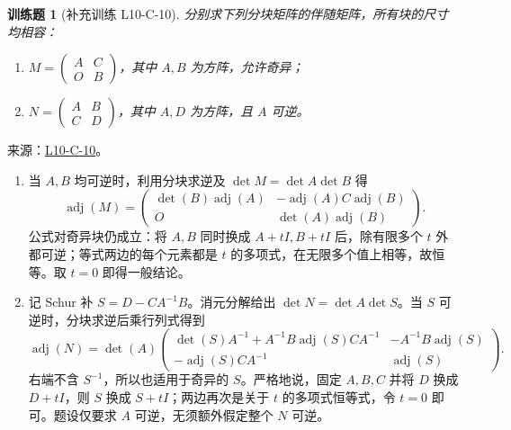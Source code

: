 \documentclass[12pt,fontset=fandol]{ctexart}
\newtheorem{exercise}{训练题}[section]
\begin{document}
\begin{exercise}[补充训练 L10-C-10]\label{prob:L10-C-10}
分别求下列分块矩阵的伴随矩阵，所有块的尺寸均相容：
\begin{enumerate}
\item $M=\begin{pmatrix}A&C\\O&B\end{pmatrix}$，其中 $A,B$ 为方阵，允许奇异；
\item $N=\begin{pmatrix}A&B\\C&D\end{pmatrix}$，其中 $A,D$ 为方阵，且 $A$ 可逆。
\end{enumerate}
\end{exercise}
\noindent 来源：\href{https://github.com/yhwu-is/Linear-Algebra-Left-Undone/blob/new/%E8%AE%B2%E4%B9%89/%E4%B8%93%E9%A2%98/10%20%E8%A1%8C%E5%88%97%E5%BC%8F.tex}{L10-C-10}。
\begin{solve}
\begin{enumerate}
\item 当 $A,B$ 均可逆时，利用分块求逆及 $\det M=\det A\det B$ 得
\[\operatorname{adj}(M)=\begin{pmatrix}\det(B)\operatorname{adj}(A)&-\operatorname{adj}(A)C\operatorname{adj}(B)\\O&\det(A)\operatorname{adj}(B)\end{pmatrix}.\]
公式对奇异块仍成立：将 $A,B$ 同时换成 $A+tI,B+tI$ 后，除有限多个 $t$ 外都可逆；等式两边的每个元素都是 $t$ 的多项式，在无限多个值上相等，故恒等。取 $t=0$ 即得一般结论。
\item 记 Schur 补 $S=D-CA^{-1}B$。消元分解给出 $\det N=\det A\det S$。当 $S$ 可逆时，分块求逆后乘行列式得到
\[\operatorname{adj}(N)=\det(A)\begin{pmatrix}
\det(S)A^{-1}+A^{-1}B\operatorname{adj}(S)CA^{-1}&-A^{-1}B\operatorname{adj}(S)\\
-\operatorname{adj}(S)CA^{-1}&\operatorname{adj}(S)
\end{pmatrix}.\]
右端不含 $S^{-1}$，所以也适用于奇异的 $S$。严格地说，固定 $A,B,C$ 并将 $D$ 换成 $D+tI$，则 $S$ 换成 $S+tI$；两边再次是关于 $t$ 的多项式恒等式，令 $t=0$ 即可。题设仅要求 $A$ 可逆，无须额外假定整个 $N$ 可逆。
\end{enumerate}
\end{solve}
\end{document}
